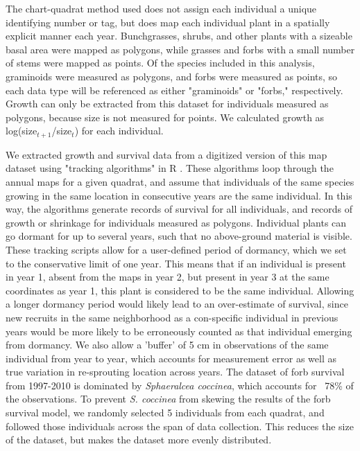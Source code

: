 \documentclass[12pt, letterpaper]{article}
\begin{document}
The chart-quadrat method used does not assign each individual a unique identifying number or tag, but does map each individual plant in a spatially explicit manner each year. Bunchgrasses, shrubs, and other plants with a sizeable basal area were mapped as polygons, while grasses and forbs with a small number of stems were mapped as points. Of the species included in this analysis, graminoids were measured as polygons, and forbs were measured as points, so each data type will be referenced as either "graminoids" or "forbs," respectively.  Growth can only be extracted from this dataset for individuals measured as polygons, because size is not measured for points. We calculated growth as log(size$_{t+1}$/size$_t$) for each individual.  

We extracted growth and survival data from a digitized version of this map dataset using "tracking algorithms" in R \citep{Lauenroth2008, RCoreTeam2019}. These algorithms loop through the annual maps for a given quadrat, and assume that individuals of the same species growing in the same location in consecutive years are the same individual. In this way, the algorithms generate records of survival for all individuals, and records of growth or shrinkage for individuals measured as polygons. Individual plants can go dormant for up to several years, such that no above-ground material is visible. These tracking scripts allow for a user-defined period of dormancy, which we set to the conservative limit of one year. This means that if an individual is present in year 1, absent from the maps in year 2, but present in year 3 at the same coordinates as year 1, this plant is considered to be the same individual. Allowing a longer dormancy period would likely lead to an over-estimate of survival, since new recruits in the same neighborhood as a con-specific individual in previous years would be more likely to be erroneously counted as that individual emerging from dormancy. We also allow a 'buffer' of 5 cm in observations of the same individual from year to year, which accounts for measurement error as well as true variation in re-sprouting location across years. 
The dataset of forb survival from 1997-2010 is dominated by \textit{Sphaeralcea coccinea}, which accounts for ~78\% of the observations. To prevent \textit{S. coccinea} from skewing the results of the forb survival model, we randomly selected 5 individuals from each quadrat, and followed those individuals across the span of data collection. This reduces the size of the dataset, but makes the dataset more evenly distributed.
\end{document}
